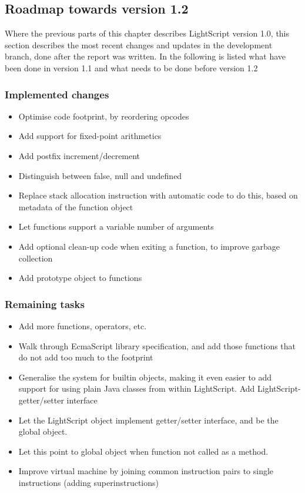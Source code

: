 \documentclass[11pt]{report}
\begin{document}
\subsection{Roadmap towards version 1.2}
Where the previous parts of this chapter describes LightScript version 1.0, this section describes the most recent changes and updates in the development branch, done after the report was written.
In the following is listed what have been done in version 1.1 and what needs to be done before version 1.2
\subsubsection{Implemented changes}
\begin{itemize}
\item Optimise code footprint, by reordering opcodes
\item Add support for fixed-point arithmetics
\item Add postfix increment/decrement
\item Distinguish between false, null and undefined
\item Replace stack allocation instruction with automatic code to do this, based on metadata of the function object 
\item Let functions support a variable number of arguments
\item Add optional clean-up code when exiting a function, to improve garbage collection
\item Add prototype object to functions
\end{itemize}
\subsubsection{Remaining tasks}
\begin{itemize}
\item Add more functions, operators, etc. 
\item Walk through EcmaScript library specification, and add those functions that do not add too much to the footprint
\item Generalise the system for builtin objects, making it even easier to add support for using plain Java classes from within LightScript. Add LightScript-getter/setter interface
\item Let the LightScript object implement getter/setter interface, and be the global object.
\item Let this point to global object when function not called as a method.
\item Improve virtual machine by joining common instruction pairs to single instructions (adding superinstructions)
\end{itemize}
\end{document}
